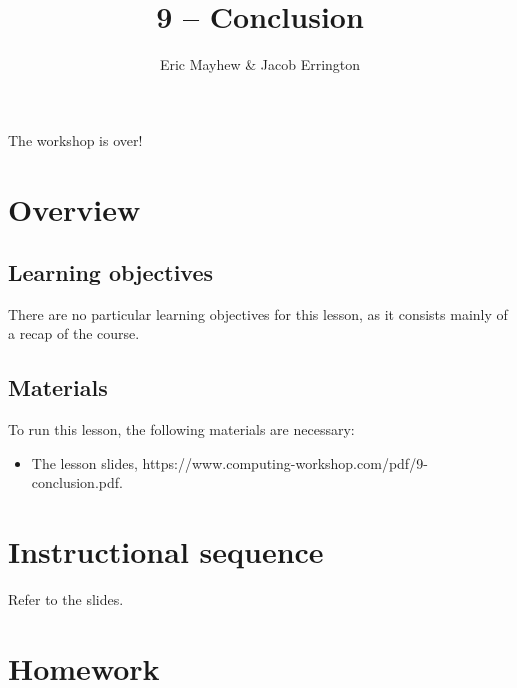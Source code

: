 \documentclass[11pt]{article}
\title{9 -- Conclusion}
\author{Eric Mayhew \& Jacob Errington}
\date{}
\newcommand{\cwurl}{https://www.computing-workshop.com/}
\newcommand{\cwpdf}{\cwurl pdf/}
\begin{document}
\maketitle

The workshop is over!

\section*{Overview}

\subsection*{Learning objectives}

There are no particular learning objectives for this lesson, as it consists
mainly of a recap of the course.

\subsection*{Materials}

To run this lesson, the following materials are necessary:

\begin{itemize}
\item The lesson slides, \cwpdf{9-conclusion.pdf}.
\end{itemize}

\section*{Instructional sequence}

Refer to the slides.

\section*{Homework}
\end{document}
